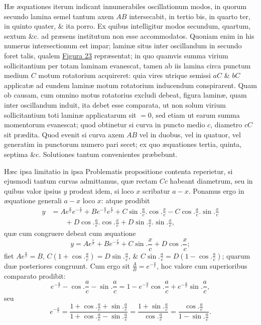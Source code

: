 Hæ æquationes iterum indicant innumerabiles oscillationum modos, in quorum secundo lamina semel tantum axem $AB$ intersecabit, in tertio bis, in quarto ter, in quinto quater, \& ita porro. Ex quibus intelligitur modos secundum, quartum, sextum \&c. ad præsens institutum non esse accommodatos. Quoniam enim in his numerus intersectionum est impar; laminæ situs inter oscillandum in secundo foret talis, qualem \hyperlink{addfig:23}{Figura 23} repræsentat; in quo quamvis summa virium sollicitantium per totam laminam evanescat, tamen ab iis lamina circa punctum medium $C$ motum rotatorium acquireret: quia vires utrique semissi $aC$ \& $bC$ applicatæ ad eundem laminæ motum rotatorium inducendum conspirarent. Quam ob causam, cum omnino motus rotatorius excludi debeat, figura laminæ, quam inter oscillandum induit, ita debet esse comparata, ut non solum virium sollicitantium toti laminæ applicatarum sit $=0$, sed etiam ut earum summa momentorum evanescat; quod obtinetur si curva in puncto medio $c$, diametro $cC$ sit prædita. Quod evenit si curva axem $AB$ vel in duobus, vel in quatuor, vel generatim in punctorum numero pari secet; ex quo æquationes tertia, quinta, septima \&c. Solutiones tantum convenientes præbebunt.

Hæc ipsa limitatio in ipsa Problematis propositione
contenta reperietur, si ejusmodi tantum curvas admittamus, quæ rectam $Cc$ habeant diametrum, seu in quibus valor ipsius $y$ prodeat idem, si loco $x$ scribatur $a-x$. Ponamus ergo in æquatione generali $a-x$ loco $x$: atque prodibit
\[\begin{aligned}
y&=Ae^{\frac ac}e^{-\frac xc}+Be^{-\frac ac}e^{\frac xc}+C\sin.\frac ac.\cos.\frac xc-C\cos.\frac ac.\sin.\frac xc\\
&\qquad+D\cos.\frac ac.\cos.\frac xc+D\sin.\frac ac.\sin.\frac xc,
\end{aligned}\]
quæ cum congruere debeat cum æquatione
\[y=Ae^{\frac xc}+Be^{-\frac xc}+C\sin.\frac xc+D\cos.\frac xc;\]
fiet $Ae^{\frac ac}=B$, $C(1+\cos.\frac ac)=D\sin.\frac ac$, \& $C\sin.\frac ac=D(1-\cos.\frac ac)$; quarum duæ posteriores congruunt. Cum ergo sit $\frac AB=e^{-\frac ac}$, hoc valore cum superioribus comparato prodibit:
\[e^{-\frac ac}-\cos.\frac ac-\sin.\frac ac=1-e^{-\frac ac}\cos.\frac ac+e^{-\frac ac}\sin.\frac ac,\]
seu
\[e^{-\frac ac}=\frac{1+\cos.\frac ac+\sin.\frac ac}{1+\cos.\frac ac-\sin.\frac ac}=\frac{1+\sin.\frac ac}{\cos.\frac ac}=\frac{\cos.\frac ac}{1-\sin.\frac ac}.\]


